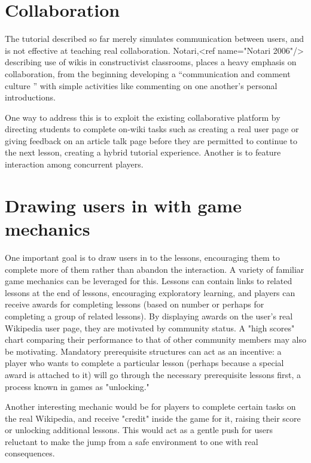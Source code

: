 \documentclass{acm_proc_article-sp}
\begin{document}
\section{Collaboration}

The tutorial described so far merely simulates communication between users, and is not effective at teaching real collaboration. Notari,<ref name="Notari 2006"/> describing use of wikis in constructivist classrooms, places a heavy emphasis on collaboration, from the beginning developing a “communication and comment culture ” with simple activities like commenting on one another's personal introductions.

One way to address this is to exploit the existing collaborative platform by directing students to complete on-wiki tasks such as creating a real user page or giving feedback on an article talk page before they are permitted to continue to the next lesson, creating a hybrid tutorial experience. Another is to feature interaction among concurrent players.

\section{Drawing users in with game mechanics}

One important goal is to draw users in to the lessons, encouraging them to complete more of them rather than abandon the interaction. A variety of familiar game mechanics can be leveraged for this. Lessons can contain links to related lessons at the end of lessons, encouraging exploratory learning, and players can receive awards for completing lessons (based on number or perhaps for completing a group of related lessons). By displaying awards on the user's real Wikipedia user page, they are motivated by community status. A "high scores" chart comparing their performance to that of other community members may also be motivating. Mandatory prerequisite structures can act as an incentive: a player who wants to complete a particular lesson (perhaps because a special award is attached to it) will go through the necessary prerequisite lessons first, a process known in games as "unlocking."

Another interesting mechanic would be for players to complete certain tasks on the real Wikipedia, and receive "credit" inside the game for it, raising their score or unlocking additional lessons. This would act as a gentle push for users reluctant to make the jump from a safe environment to one with real consequences.
\end{document}
